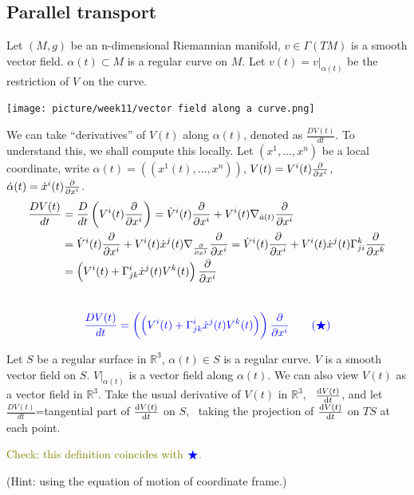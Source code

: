 \subsection{Parallel transport}
Let \((M,g)\) be an n-dimensional Riemannian manifold, \(v\in 
\Gamma(TM)\) is a smooth vector field. \(\alpha(t)\subset M\) is a 
regular curve on \(M\). Let \(v(t)=v|_{\alpha(t)}\) be the restriction of 
\(V\) on the curve.
\begin{center}
    \texttt{[image: picture/week11/vector field 
    along a curve.png]}
\end{center}
We can take ``derivatives'' of \(V(t)\) along 
\(\alpha(t)\), denoted as \(\frac{D V(t)}{dt}\). To understand this,
we shall compute this locally. Let \((x^1,\ldots, x^n)\) be a local
coordinate, write \(\alpha(t)=\left((x^1(t),\ldots,x^n)\right)\), 
\(V(t)=V^i(t)\pdv{x^i}\), \(\dot{\alpha}(t)=\dot{x}^i(t)\pdv{x^i}\).
\begin{align*}
    \frac{DV(t)}{dt}&=\frac{D}{dt}\left(V^i(t)\pdv{x^i}\right)
    =\dot{V}^i(t)\pdv{x^i}+V^i(t)\nabla_{\dot{a}(t)}\pdv{x^i}\\
    &=\dot{V}^i(t)\pdv{x^i}+V^i(t)\dot{x}^j(t)\nabla_{\pdv{x^j}}\pdv{x^i}
    =\dot{V}^i(t)\pdv{x^i}+
    V^i(t)\dot{x}^j(t)\Gamma\indices*{_{ji}^k}\pdv{x^k}\\
    &=\left(V^i(t)+
    \Gamma\indices*{_{jk}^i}\dot{x}^j(t)V^k(t)\right)\pdv{x^i}
\end{align*}
\ie\ 
\[
    \textcolor{blue}{
        \frac{DV(t)}{dt}=\left(\left(V^i(t)+
        \Gamma\indices*{_{jk}^i}\dot{x}^j(t)V^k(t)\right)\right)
        \pdv{x^i}
        \tag{\(\textcolor{blue}{\bigstar}\)}
    }
\]
\begin{remark}
    Let \(S\) be a regular surface in \(\mathbb{R}^3\),
    \(\alpha(t)\in S\) is a regular curve. \(V\) is a smooth vector
    field on \(S\). \(V|_{\alpha(t)}\) is a vector field along
    \(\alpha(t)\). We can also view \(V(t)\) as a vector field in 
    \(\mathbb{R}^3\). Take the usual derivative of \(V(t)\) in 
    \(\mathbb{R}^3\), \ie\ \(\dv{V(t)}{t}\), and let
    \(\frac{DV(t)}{dt}\)=tangential part of \(\dv{V(t)}{t}\) on \(S\),
    \ie\ taking the projection of \(\dv{V(t)}{t}\) on \(TS\) at each point.
\end{remark}
\textcolor{olive}{
    \begin{exercise}
        Check: this definition coincides with 
        \(\textcolor{blue}{\bigstar}\).
    \end{exercise}
}
(Hint: using the equation of motion of coordinate frame.)
